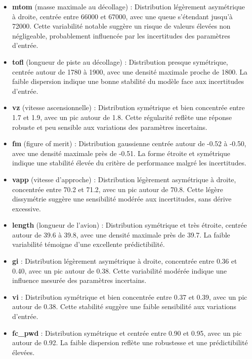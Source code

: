 \documentclass[a4paper, 11pt]{article}
\begin{document}
\begin{itemize}
    \item \textbf{mtom} (masse maximale au décollage) : Distribution légèrement asymétrique à droite, centrée entre 66000 et 67000, avec une queue s’étendant jusqu’à 72000. Cette variabilité notable suggère un risque de valeurs élevées non négligeable, probablement influencée par les incertitudes des paramètres d’entrée.
    
    \item \textbf{tofl} (longueur de piste au décollage) : Distribution presque symétrique, centrée autour de 1780 à 1900, avec une densité maximale proche de 1800. La faible dispersion indique une bonne stabilité du modèle face aux incertitudes d’entrée.
    
    \item \textbf{vz} (vitesse ascensionnelle) : Distribution symétrique et bien concentrée entre 1.7 et 1.9, avec un pic autour de 1.8. Cette régularité reflète une réponse robuste et peu sensible aux variations des paramètres incertains.
    
    \item \textbf{fm} (figure of merit) : Distribution gaussienne centrée autour de -0.52 à -0.50, avec une densité maximale près de -0.51. La forme étroite et symétrique indique une stabilité élevée du critère de performance malgré les incertitudes.
    
    \item \textbf{vapp} (vitesse d’approche) : Distribution légèrement asymétrique à droite, concentrée entre 70.2 et 71.2, avec un pic autour de 70.8. Cette légère dissymétrie suggère une sensibilité modérée aux incertitudes, sans dérive excessive.
    
    \item \textbf{length} (longueur de l’avion) : Distribution symétrique et très étroite, centrée autour de 39.6 à 39.8, avec une densité maximale près de 39.7. La faible variabilité témoigne d’une excellente prédictibilité.
    
    \item \textbf{gi} : Distribution légèrement asymétrique à droite, concentrée entre 0.36 et 0.40, avec un pic autour de 0.38. Cette variabilité modérée indique une influence mesurée des paramètres incertains.
    
    \item \textbf{vi} : Distribution symétrique et bien concentrée entre 0.37 et 0.39, avec un pic autour de 0.38. Cette stabilité suggère une faible sensibilité aux variations d’entrée.
    
    \item \textbf{fc\_pwd} : Distribution symétrique et centrée entre 0.90 et 0.95, avec un pic autour de 0.92. La faible dispersion reflète une robustesse et une prédictibilité élevées.
\end{itemize}
\end{document}
